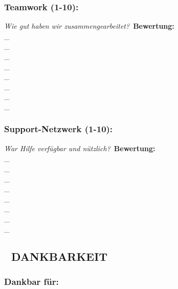 \subsubsection{\textbf{Teamwork (1-10):}}

\textit{\textcolor{ctmmYellow}{} Wie gut haben wir zusammengearbeitet?}\
\textbf{Bewertung:} \\\_\\\_\\\_\\\_\\\_\\\_\\\_\\\_

\subsubsection{\textbf{Support-Netzwerk (1-10):}}

\textit{\textcolor{ctmmYellow}{} War Hilfe verfügbar und nützlich?}\
\textbf{Bewertung:} \\\_\\\_\\\_\\\_\\\_\\\_\\\_\\\_

\subsection{\textbf{💝 DANKBARKEIT}}

\subsubsection{\textbf{Dankbar für:}}

